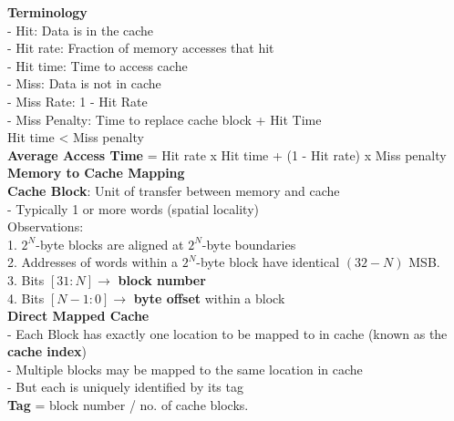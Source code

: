 \documentclass[10pt, a4paper]{article}
\newcommand{\highlight}[1]{{\color{red}\textbf{#1}}}
\newcommand{\red}[1]{{\color{red}#1}}
\newcommand{\green}[1]{{\color{ForestGreen}#1}}
\begin{document}
\begin{multicols*}{3}
		\textbf{Terminology}\\
		- \green{Hit}: Data is in the cache\\
		- \green{Hit rate}: Fraction of memory accesses that hit\\
		- \green{Hit time}: Time to access cache\\
		- \red{Miss}: Data is not in cache\\
		- \red{Miss Rate}: 1 - \green{Hit Rate}\\
		- \red{Miss Penalty}: Time to replace cache block + \green{Hit Time}\\
		Hit time < Miss penalty\\
		\highlight{Average Access Time} = Hit rate x Hit time + (1 - Hit rate) x Miss penalty\\

		\textbf{Memory to Cache Mapping}\\
		\highlight{Cache Block}: Unit of transfer between memory and cache\\
		- Typically 1 or more words (spatial locality)\\

		Observations:\\
		1. $2^{N}$-byte blocks are aligned at $2^{N}$-byte boundaries\\
		2. Addresses of words within a $2^{N}$-byte block have identical $(32-N)$ MSB.\\
		3. Bits $[31:N] \rightarrow$ \highlight{block number}\\
		4. Bits $[N-1:0] \rightarrow$ \highlight{byte offset} within a block\\

		\textbf{Direct Mapped Cache}\\
		- Each Block has exactly one location to be mapped to in cache (known as the \highlight{cache index})\\
		- Multiple blocks may be mapped to the same location in cache\\
		- But each is uniquely identified by its tag\\
		\highlight{Tag} = block number / no. of cache blocks.\\


\end{multicols*}
\end{document}
